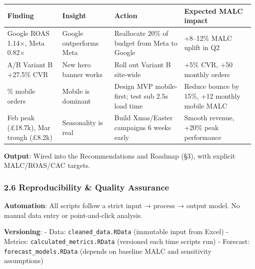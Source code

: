 \documentclass[
  11pt,
]{article}
\begin{document}
\begin{longtable}[]{@{}
  >{\raggedright\arraybackslash}p{}
  >{\raggedright\arraybackslash}p{}
  >{\raggedright\arraybackslash}p{}
  >{\raggedright\arraybackslash}p{}@{}}
\toprule\noalign{}
\begin{minipage}[b]{\linewidth}\raggedright
Finding
\end{minipage} & \begin{minipage}[b]{\linewidth}\raggedright
Insight
\end{minipage} & \begin{minipage}[b]{\linewidth}\raggedright
Action
\end{minipage} & \begin{minipage}[b]{\linewidth}\raggedright
Expected MALC impact
\end{minipage} \\
\midrule\noalign{}
\endhead
\bottomrule\noalign{}
\endlastfoot
Google ROAS 1.14×, Meta 0.82× & Google outperforms Meta & Reallocate
20\% of budget from Meta to Google & +8--12\% MALC uplift in Q2 \\
A/B Variant B +27.5\% CVR & New hero banner works & Roll out Variant B
site-wide & +5\% CVR, +50 monthly orders \\
69\% mobile orders & Mobile is dominant & Design MVP mobile-first; test
sub 2.5s load time & Reduce bounce by 15\%, +12 monthly mobile MALC \\
Feb peak (£18.7k), Mar trough (£8.2k) & Seasonality is real & Build
Xmas/Easter campaigns 6 weeks early & Smooth revenue, +20\% peak
performance \\
\end{longtable}

\textbf{Output}: Wired into the Recommendations and Roadmap (§3), with
explicit MALC/ROAS/CAC targets.

\subsubsection{2.6 Reproducibility \& Quality
Assurance}\label{reproducibility-quality-assurance}

\textbf{Automation}: All scripts follow a strict input → process →
output model. No manual data entry or point-and-click analysis.

\textbf{Versioning}: - Data: \texttt{cleaned\_data.RData} (immutable
input from Excel) - Metrics: \texttt{calculated\_metrics.RData}
(versioned each time scripts run) - Forecast:
\texttt{forecast\_models.RData} (depends on baseline MALC and
sensitivity assumptions)
\end{document}
